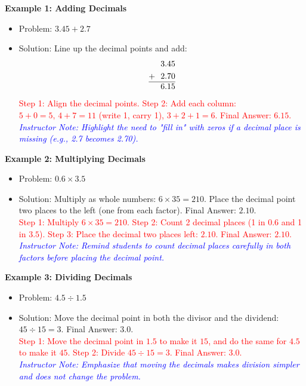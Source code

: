 \documentclass[12pt]{article}
\begin{document}
\begin{tcolorbox}[colframe=black!60, colback=white, 
coltitle=black, colbacktitle=black!15, fonttitle=\bfseries\Large, 
title=Examples, halign title=center, left=10pt, right=10pt, top=10pt, bottom=15pt]
\textbf{Example 1: Adding Decimals}
\begin{itemize}
    \item Problem: \( 3.45 + 2.7 \)
    \item Solution: Line up the decimal points and add:
    \[
    \begin{aligned}
        & \,\,\,\,3.45 \\
        + & \,\,\,\,2.70 \\
        \hline
        & \,\,\,\,6.15
    \end{aligned}
    \]
    \textcolor{red}{Step 1: Align the decimal points. Step 2: Add each column: \( 5+0=5, \, 4+7=11 \) (write 1, carry 1), \( 3+2+1=6 \). Final Answer: \( 6.15 \).}\\
    \textcolor{blue}{\textit{Instructor Note: Highlight the need to "fill in" with zeros if a decimal place is missing (e.g., 2.7 becomes 2.70).}}
\end{itemize}

\textbf{Example 2: Multiplying Decimals}
\begin{itemize}
    \item Problem: \( 0.6 \times 3.5 \)
    \item Solution: Multiply as whole numbers: \( 6 \times 35 = 210 \). Place the decimal point two places to the left (one from each factor). Final Answer: \( 2.10 \).\\
    \textcolor{red}{Step 1: Multiply \( 6 \times 35 = 210 \). Step 2: Count 2 decimal places (1 in \( 0.6 \) and 1 in \( 3.5 \)). Step 3: Place the decimal two places left: \( 2.10 \). Final Answer: \( 2.10 \).}\\
    \textcolor{blue}{\textit{Instructor Note: Remind students to count decimal places carefully in both factors before placing the decimal point.}}
\end{itemize}

\textbf{Example 3: Dividing Decimals}
\begin{itemize}
    \item Problem: \( 4.5 \div 1.5 \)
    \item Solution:
    Move the decimal point in both the divisor and the dividend: \( 45 \div 15 = 3 \). Final Answer: \( 3.0 \).\\
    \textcolor{red}{Step 1: Move the decimal point in \( 1.5 \) to make it \( 15 \), and do the same for \( 4.5 \) to make it \( 45 \). Step 2: Divide \( 45 \div 15 = 3 \). Final Answer: \( 3.0 \).}\\
    \textcolor{blue}{\textit{Instructor Note: Emphasize that moving the decimals makes division simpler and does not change the problem.}}
\end{itemize}
\end{tcolorbox}
\end{document}
